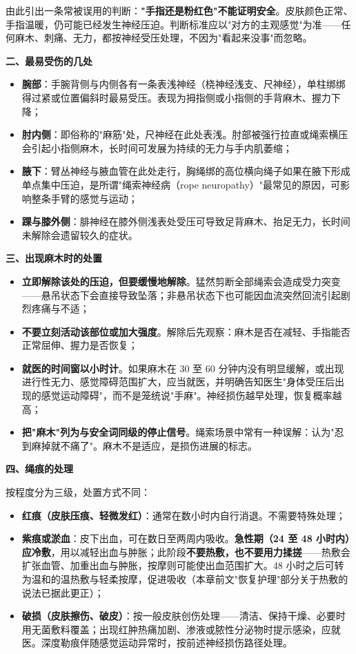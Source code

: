 \documentclass[12pt,UTF8]{ctexbook}
\begin{document}
由此引出一条常被误用的判断：\textbf{"手指还是粉红色"不能证明安全}。皮肤颜色正常、手指温暖，仍可能已经发生神经压迫。判断标准应以"对方的主观感觉"为准——任何麻木、刺痛、无力，都按神经受压处理，不因为"看起来没事"而忽略。

\textbf{二、最易受伤的几处}

\begin{itemize}
\item \textbf{腕部}：手腕背侧与内侧各有一条表浅神经（桡神经浅支、尺神经），单柱绑绑得过紧或位置偏斜时最易受压。表现为拇指侧或小指侧的手背麻木、握力下降；
\item \textbf{肘内侧}：即俗称的"麻筋"处，尺神经在此处表浅。肘部被强行拉直或绳索横压会引起小指侧麻木，长时间可发展为持续的无力与手内肌萎缩；
\item \textbf{腋下}：臂丛神经与腋血管在此处走行，胸绳绑的高位横向绳子如果在腋下形成单点集中压迫，是所谓"绳索神经病（rope neuropathy）"最常见的原因，可影响整条手臂的感觉与运动；
\item \textbf{踝与膝外侧}：腓神经在膝外侧浅表处受压可导致足背麻木、抬足无力，长时间未解除会遗留较久的症状。
\end{itemize}

\textbf{三、出现麻木时的处置}

\begin{itemize}
\item \textbf{立即解除该处的压迫，但要缓慢地解除}。猛然剪断全部绳索会造成受力突变——悬吊状态下会直接导致坠落；非悬吊状态下也可能因血流突然回流引起剧烈疼痛与不适；
\item \textbf{不要立刻活动该部位或加大强度}。解除后先观察：麻木是否在减轻、手指能否正常屈伸、握力是否恢复；
\item \textbf{就医的时间窗以小时计}。如果麻木在 30 至 60 分钟内没有明显缓解，或出现进行性无力、感觉障碍范围扩大，应当就医，并明确告知医生"身体受压后出现的感觉运动障碍"，而不是笼统说"手麻"。神经损伤越早处理，恢复概率越高；
\item \textbf{把"麻木"列为与安全词同级的停止信号}。绳索场景中常有一种误解：认为"忍到麻掉就不痛了"。麻木不是适应，是损伤进展的标志。
\end{itemize}

\textbf{四、绳痕的处理}

按程度分为三级，处置方式不同：

\begin{itemize}
\item \textbf{红痕（皮肤压痕、轻微发红）}：通常在数小时内自行消退。不需要特殊处理；
\item \textbf{紫痕或淤血}：皮下出血，可在数日至两周内吸收。\textbf{急性期（24 至 48 小时内）应冷敷}，用以减轻出血与肿胀；此阶段\textbf{不要热敷，也不要用力揉搓}——热敷会扩张血管、加重出血与肿胀，按摩则可能使出血范围扩大。48 小时之后可转为温和的温热敷与轻柔按摩，促进吸收（本章前文"恢复护理"部分关于热敷的说法已据此更正）；
\item \textbf{破损（皮肤擦伤、破皮）}：按一般皮肤创伤处理——清洁、保持干燥、必要时用无菌敷料覆盖；出现红肿热痛加剧、渗液或脓性分泌物时提示感染，应就医。深度勒痕伴随感觉运动异常时，按前述神经损伤路径处理。
\end{itemize}
\end{document}
